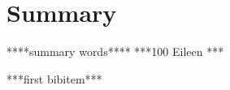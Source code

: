 \documentclass[11pt]{amsart}
\begin{document}

\section*{Summary}
****summary words****
***100 Eileen ***

\begin{thebibliography}{10}
 ***first bibitem***


\end{thebibliography}
\end{document}
